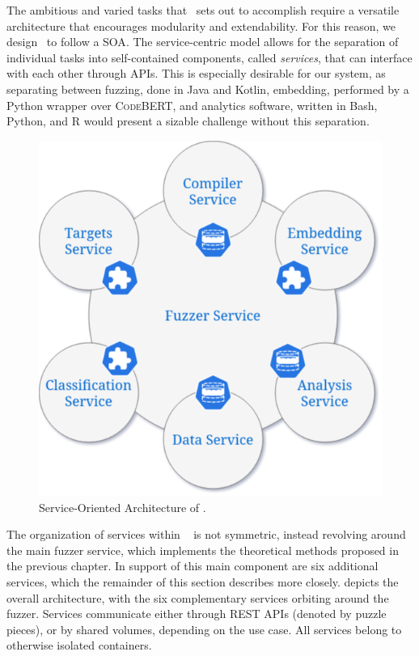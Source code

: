 The ambitious and varied tasks that \kf~sets out to accomplish
require a versatile architecture that encourages modularity
and extendability.
For this reason, we design \kf~to follow a \gls{SOA}.
The service-centric model allows for the separation of
individual tasks into self-contained components, called
\textit{services}, that can interface with each other
through APIs.
This is especially desirable for our system, as separating between
fuzzing, done in Java and Kotlin, embedding, performed by a Python
wrapper over \textsc{CodeBERT}, and analytics software, written
in Bash, Python, and R would present a sizable challenge
without this separation.


\begin{figure}[t]
\centering
\includegraphics[scale=0.3]{img/services.png}
\caption{Service-Oriented Architecture of \kf.}
\label{fig:services}
\end{figure}

The organization of services within \kf~ is not symmetric,
instead revolving around the main fuzzer service, which implements the
theoretical methods proposed in the previous chapter.
In support of this main component are six additional services, which the remainder of
this section describes more closely.
 depicts the overall architecture, with the six complementary
services orbiting around the fuzzer.
Services communicate either through REST APIs (denoted by puzzle pieces),
or by shared volumes, depending on the use case.
All services belong to otherwise isolated containers.

